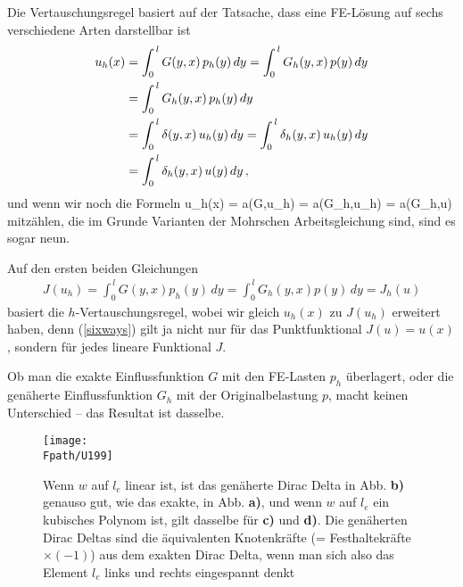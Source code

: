 {Die Vertauschungsregel basiert auf der Tatsache, dass eine FE-L\"{o}sung auf sechs verschiedene Arten darstellbar ist
\begin{align}
\label{sixways}
u_h(x) &= \int_0^{\,l}  G(y, x)\, p_h(y) \,dy = \int_0^{\,l}  G_h(y, x) \,p(y) \,dy\nonumber \\
 &= \int_0^{\,l}  G_h(y, x)\, p_h(y) \,dy \nonumber \\
  &= \int_0^{\,l}  \delta(y, x)\, u_h(y) \,dy =\int_0^{\,l}  \delta_h(y,x)\, u_h(y)\,dy \nonumber \\
&=\int_0^{\,l}  \delta_h(y,x)\, u(y) \,dy\,,
\end{align}
und wenn wir noch die Formeln
\beq
u_h(x) = a(G,u_h) = a(G_h,u_h) = a(G_h,u)
\eeq
mitz\"{a}hlen, die im Grunde Varianten der Mohrschen Arbeitsgleichung sind, sind es sogar neun.

Auf den ersten beiden Gleichungen
\begin{align}
J(u_h) = \int_0^{\,l} G(y, x) p_h(y) \,dy = \int_0^{\,l}  G_h(y, x) p(y) \,dy = J_h(u)
\end{align}
basiert die $h$-Vertauschungsregel, wobei wir gleich $u_h(x)$ zu $J(u_h)$ erweitert haben, denn (\ref{sixways}) gilt ja nicht nur f\"{u}r das Punktfunktional $J(u) = u(x)$, sondern f\"{u}r jedes lineare Funktional $J$.

Ob man die exakte Einflussfunktion $G$ mit den FE-Lasten $p_h$ \"{u}berlagert, oder die gen\"{a}herte Einflussfunktion $G_h$ mit der Originalbelastung $p$, macht keinen Unterschied -- das Resultat ist dasselbe.
\begin{figure}[tbp]
\centering
\if {} \sidecaption \fi
\texttt{[image: \\Fpath/U199]}
\caption{Wenn $w$ auf $l_e$ linear ist, ist das gen\"{a}herte Dirac Delta in Abb. \textbf{ b)}
genauso gut, wie das exakte, in Abb. \textbf{ a)}, und wenn $w$ auf $l_e$ ein kubisches Polynom ist, gilt dasselbe f\"{u}r \textbf{ c)} und \textbf{ d)}. Die gen\"{a}herten Dirac Deltas sind die \"{a}quivalenten Knotenkr\"{a}fte (= Festhaltekr\"{a}fte $\times (-1)$) aus dem exakten Dirac Delta, wenn man sich also das Element $l_e$ links und rechts eingespannt denkt} \label{U199}
\end{figure}%

}
